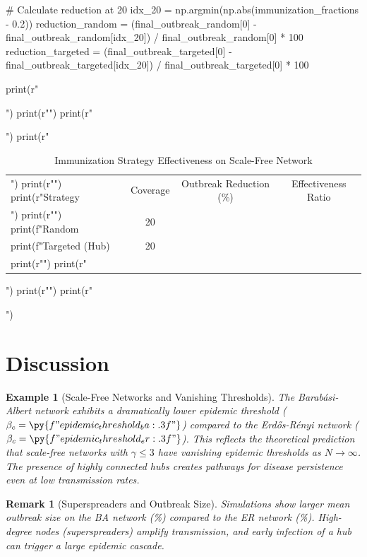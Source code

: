 \documentclass[a4paper, 11pt]{article}
\newtheorem{example}{Example}[section]
\newtheorem{remark}{Remark}[section]
\begin{document}
\begin{pycode}
# Calculate reduction at 20%
idx_20 = np.argmin(np.abs(immunization_fractions - 0.2))
reduction_random = (final_outbreak_random[0] - final_outbreak_random[idx_20]) / final_outbreak_random[0] * 100
reduction_targeted = (final_outbreak_targeted[0] - final_outbreak_targeted[idx_20]) / final_outbreak_targeted[0] * 100

print(r"\begin{table}[htbp]")
print(r"\centering")
print(r"\caption{Immunization Strategy Effectiveness on Scale-Free Network}")
print(r"\begin{tabular}{lccc}")
print(r"\toprule")
print(r"Strategy & Coverage & Outbreak Reduction (\%) & Effectiveness Ratio \\")
print(r"\midrule")
print(f"Random & 20\\%
print(f"Targeted (Hub) & 20\\%
print(r"\bottomrule")
print(r"\end{tabular}")
print(r"\label{tab:immunization}")
print(r"\end{table}")
\end{pycode}

\section{Discussion}

\begin{example}[Scale-Free Networks and Vanishing Thresholds]
The Barabási-Albert network exhibits a dramatically lower epidemic threshold
($\beta_c = \py{f"{epidemic_threshold_ba:.3f}"}$) compared to the Erdős-Rényi network
($\beta_c = \py{f"{epidemic_threshold_er:.3f}"}$). This reflects the theoretical prediction
that scale-free networks with $\gamma \leq 3$ have vanishing epidemic thresholds as $N \to \infty$.
The presence of highly connected hubs creates pathways for disease persistence even at low
transmission rates.
\end{example}

\begin{remark}[Superspreaders and Outbreak Size]
Simulations show larger mean outbreak size on the BA network (\%)
compared to the ER network (\%). High-degree nodes (superspreaders)
amplify transmission, and early infection of a hub can trigger a large epidemic cascade.
\end{remark}
\end{document}
